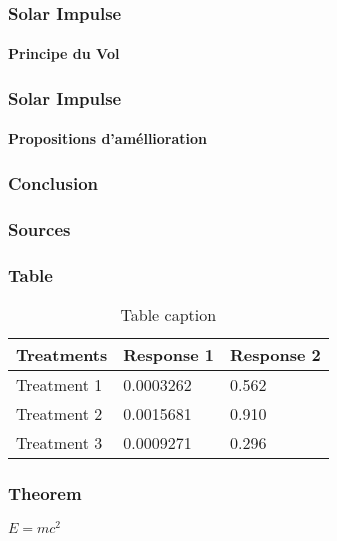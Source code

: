 \documentclass{beamer}
\begin{document}
\begin{frame}
\frametitle{Solar Impulse}
\framesubtitle{Principe du Vol}




\end{frame}


\begin{frame}
\frametitle{Solar Impulse}
\framesubtitle{Propositions d'améllioration}




\end{frame}

\begin{frame}
\frametitle{Conclusion}





\end{frame}

\begin{frame}
\frametitle{Sources}





\end{frame}
\begin{frame}
\frametitle{Table}
\begin{table}
\begin{tabular}{l l l}
\toprule
\textbf{Treatments} & \textbf{Response 1} & \textbf{Response 2}\\
\midrule
Treatment 1 & 0.0003262 & 0.562 \\
Treatment 2 & 0.0015681 & 0.910 \\
Treatment 3 & 0.0009271 & 0.296 \\
\bottomrule
\end{tabular}
\caption{Table caption}
\end{table}
\end{frame}


\begin{frame}
\frametitle{Theorem}
\begin{theorem}
$E = mc^2$
\end{theorem}
\end{frame}
\end{document}
